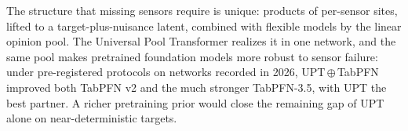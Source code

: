 The structure that missing sensors require is unique: products of per-sensor sites, lifted to a target-plus-nuisance
latent, combined with flexible models by the linear opinion pool. The Universal Pool Transformer realizes it in one
network, and the same pool makes pretrained foundation models more robust to sensor failure: under pre-registered
protocols on networks recorded in 2026, UPT\,$\oplus$\,TabPFN improved both TabPFN v2 and the much stronger
TabPFN-3.5, with UPT the best partner. A richer pretraining prior would close the remaining gap of UPT alone on
near-deterministic targets.
